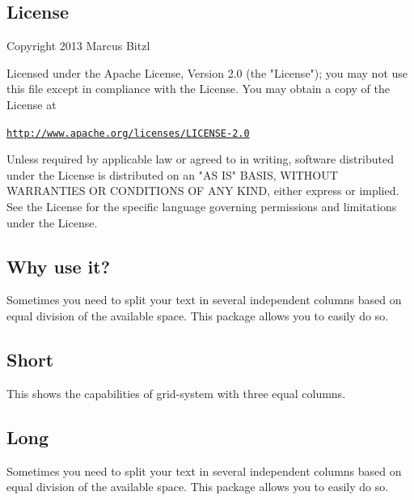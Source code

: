 \documentclass[DIV13,a4paper]{scrartcl}
\begin{document}
	\bigskip
	
	\begin{row}[cellsep=0.75cm]{3}{2}
		\begin{cell}{2}
			\section*{License}
			\vspace{-1.5ex}
			Copyright 2013 Marcus Bitzl
			
			\medskip
			
			Licensed under the Apache License, Version 2.0 (the "License");
			you may not use this file except in compliance with the License.
			You may obtain a copy of the License at
			
			\medskip
			
			\hspace*{1.2em}\href{http://www.apache.org/licenses/LICENSE-2.0}{\texttt{http://www.apache.org/licenses/LICENSE-2.0}}
			
			\medskip
			
			Unless required by applicable law or agreed to in writing, software
			distributed under the License is distributed on an "AS IS" BASIS,
			WITHOUT WARRANTIES OR CONDITIONS OF ANY KIND, either express or implied.
			See the License for the specific language governing permissions and
			limitations under the License.
		\end{cell}%
		\begin{cell}{1}
			\section*{Why use it?}
			\vspace{-1.5ex}
			Sometimes you need to split your text in several independent columns based on equal division of the available space. This package allows you to easily do so.
		\end{cell}
	\end{row}
	
	\bigskip
	
	\begin{row}[cellsep=0.75cm]{3}{2}
		\begin{cell}{1}
			\section*{Short}
			\vspace{-1.5ex}
			This shows the capabilities of grid-system with three equal columns.
		\end{cell}
		\begin{cell}{2}
			\section*{Long}
			\vspace{-1.5ex}
			Sometimes you need to split your text in several independent columns based on equal division of the available space. This package allows you to easily do so.
		\end{cell}
	\end{row}
	
\end{document}
